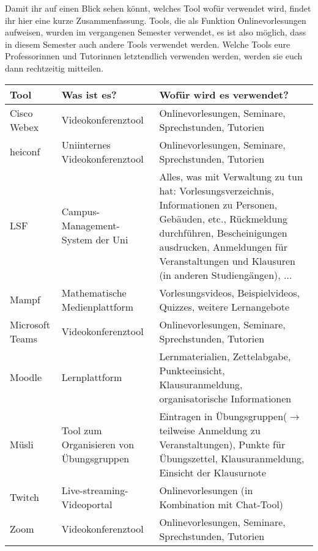 \documentclass[12pt]{article}
\begin{document}
	Damit ihr auf einen Blick sehen könnt, welches Tool wofür verwendet wird, findet ihr hier eine kurze Zusammenfassung. Tools, die als Funktion Onlinevorlesungen aufweisen, wurden im vergangenen Semester verwendet, es ist also möglich, dass in diesem Semester auch andere Tools verwendet werden. Welche Tools eure Professorinnen und Tutorinnen letztendlich verwenden werden, werden sie euch dann rechtzeitig mitteilen. \\
	
	\begin{tabular}{| L{2cm} | L{4cm} | L{9cm}|}
		\hline
		\textbf{Tool} & \textbf{Was ist es?} &  \textbf{Wofür wird es verwendet?} \\ \hline
		Cisco Webex & Videokonferenztool & Onlinevorlesungen, Seminare, Sprechstunden, Tutorien \\ \hline
		
		heiconf & Uniinternes Videokonferenztool & Onlinevorlesungen, Seminare, Sprechstunden, Tutorien \\ \hline
		
		LSF &  Campus-Management-System der Uni & Alles, was mit Verwaltung zu tun hat: Vorlesungsverzeichnis, Informationen zu Personen, Gebäuden, etc., Rückmeldung durchführen, Bescheinigungen ausdrucken, Anmeldungen für Veranstaltungen und Klausuren (in anderen Studiengängen), ...\\ \hline
		
		Mampf & Mathematische Medienplattform & Vorlesungsvideos, Beispielvideos, Quizzes, weitere Lernangebote \\ \hline
		
		Microsoft Teams & Videokonferenztool & Onlinevorlesungen, Seminare, Sprechstunden, Tutorien \\ \hline
		
		Moodle & Lernplattform & Lernmaterialien, Zettelabgabe, Punkteeinsicht, Klausuranmeldung, organisatorische Informationen \\ \hline
		
		Müsli & Tool zum Organisieren von Übungsgruppen & Eintragen in Übungsgruppen($\rightarrow$ teilweise Anmeldung zu Veranstaltungen), Punkte für Übungszettel, Klausuranmeldung, Einsicht der Klausurnote \\ \hline
		
		Twitch & Live-streaming-Videoportal & Onlinevorlesungen (in Kombination mit Chat-Tool) \\ \hline
		
		Zoom & Videokonferenztool & Onlinevorlesungen, Seminare, Sprechstunden, Tutorien \\ \hline
	\end{tabular}
\end{document}
